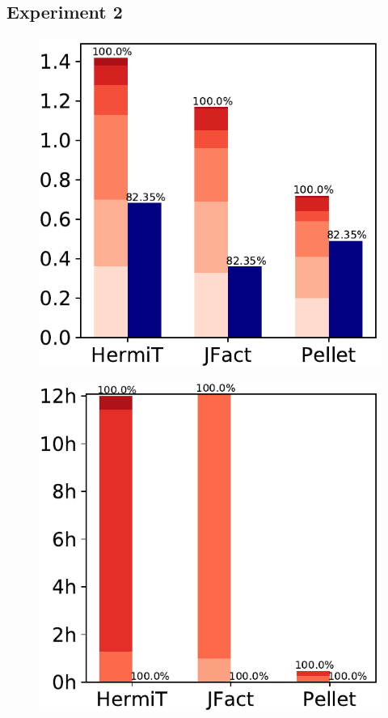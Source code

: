 \documentclass[12pt,a4paper]{article}
\begin{document}
\subsection{Experiment 2}

\begin{figure}[H]
	\includegraphics[width=\textwidth]{eval2Family} 	
\end{figure}

\begin{figure}[H]
	\includegraphics[width=\textwidth]{eval2Beer} 
\end{figure}
\end{document}
